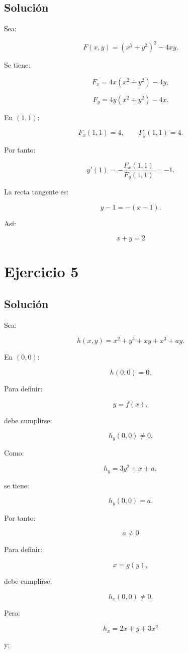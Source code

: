 \documentclass[11pt,a4paper]{article}
\begin{document}
\subsection{Solución}

Sea:

\[
F(x,y)
=
(x^2+y^2)^2-4xy.
\]

Se tiene:

\[
F_x
=
4x(x^2+y^2)-4y,
\]

\[
F_y
=
4y(x^2+y^2)-4x.
\]

En \((1,1)\):

\[
F_x(1,1)=4,
\qquad
F_y(1,1)=4.
\]

Por tanto:

\[
y'(1)
=
-\frac{F_x(1,1)}{F_y(1,1)}
=
-1.
\]

La recta tangente es:

\[
y-1=-(x-1).
\]

Así:

\[
\boxed{
x+y=2
}
\]

\section{Ejercicio 5}
\subsection{Solución}

Sea:

\[
h(x,y)
=
x^2+y^3+xy+x^3+ay.
\]

En \((0,0)\):

\[
h(0,0)=0.
\]

Para definir:

\[
y=f(x),
\]

debe cumplirse:

\[
h_y(0,0)\neq0.
\]

Como:

\[
h_y
=
3y^2+x+a,
\]

se tiene:

\[
h_y(0,0)=a.
\]

Por tanto:

\[
\boxed{
a\neq0
}
\]

Para definir:

\[
x=g(y),
\]

debe cumplirse:

\[
h_x(0,0)\neq0.
\]

Pero:

\[
h_x
=
2x+y+3x^2
\]

y:
\end{document}
